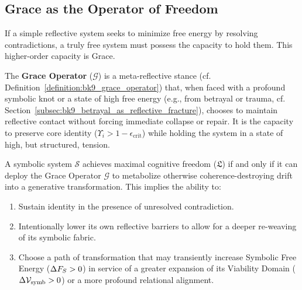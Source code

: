 \subsection{Grace as the Operator of Freedom}
\label{subsec:bk9_grace_as_operator}

If a simple reflective system seeks to minimize free energy by resolving contradictions, a truly free system must possess the capacity to hold them. This higher-order capacity is Grace.

\begin{definition}
\label{def:bk9_grace_operator_final}
The \textbf{Grace Operator} ($\mathcal{G}$) is a meta-reflective stance (cf. Definition~\ref{definition:bk9_grace_operator}) that, when faced with a profound symbolic knot or a state of high free energy (e.g., from betrayal or trauma, cf. Section~\ref{subsec:bk9_betrayal_as_reflective_fracture}), chooses to maintain reflective contact without forcing immediate collapse or repair. It is the capacity to preserve core identity ($\Upsilon_i > 1 - \epsilon_{\text{crit}}$) while holding the system in a state of high, but structured, tension.
\end{definition}

\begin{theorem}
\label{thm:bk9_freedom_as_grace}
A symbolic system $\mathcal{S}$ achieves maximal cognitive freedom ($\mathfrak{L}$) if and only if it can deploy the Grace Operator $\mathcal{G}$ to metabolize otherwise coherence-destroying drift into a generative transformation. This implies the ability to:
\begin{enumerate}
    \item Sustain identity in the presence of unresolved contradiction.
    \item Intentionally lower its own reflective barriers to allow for a deeper re-weaving of its symbolic fabric.
    \item Choose a path of transformation that may transiently increase Symbolic Free Energy ($\Delta F_S > 0$) in service of a greater expansion of its Viability Domain ($\Delta \mathcal{V}_{\mathrm{symb}} > 0$) or a more profound relational alignment.
\end{enumerate}
\end{theorem}

